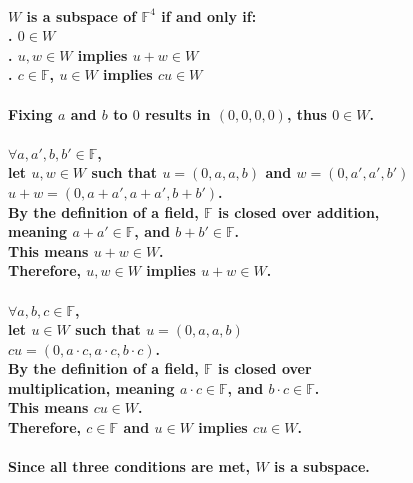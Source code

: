 \documentclass{article}
\begin{document}
\paragraph{\large
$W$ is a subspace of $\mathds{F}^{4}$ if and only if:
\\. $0 \in W$
\\. $u,w \in W$ implies $u + w \in W$
\\. $c \in \mathds{F}$, $u \in W$ implies $cu \in W$}

\paragraph{\large
Fixing $a$ and $b$ to $0$ results in $(0, 0, 0, 0)$, thus $0 \in W$.}

\paragraph{\large
$\forall a,a',b,b' \in \mathds{F}$,
\\\indent let $u,w \in W$ such that $u = (0, a, a, b)$ and $w = (0, a', a', b')$
\\\indent $ u + w = (0, a + a', a + a', b + b')$.
\\\indent By the definition of a field, $\mathds{F}$ is closed over addition, 
\\\indent meaning $a + a' \in \mathds{F}$, and $b + b' \in \mathds{F}$.
\\\indent This means $u + w \in W$.
\\\indent Therefore, $u,w \in W$ implies $u + w \in W$.}

\paragraph{\large
$\forall a,b,c \in \mathds{F}$,
\\\indent let $u \in W$ such that $u = (0, a, a, b)$
\\\indent $ cu = (0, a \cdot c, a \cdot c, b \cdot c)$.
\\\indent By the definition of a field, $\mathds{F}$ is closed over 
\\\indent multiplication, meaning $a \cdot c \in \mathds{F}$, and $b \cdot c \in \mathds{F}$.
\\\indent This means $cu \in W$.
\\\indent Therefore, $c \in \mathds{F}$ and $u \in W$ implies $cu \in W$.}

\paragraph{\large
Since all three conditions are met, $W$ is a subspace.}
\end{document}

